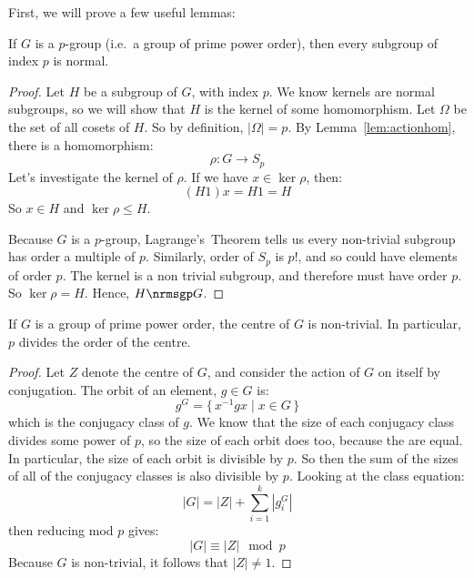 First, we will prove a few useful lemmas:

\begin{lemma}\label{lem:index_p_normal}
    \raggedright
    If \(G\) is a \(p\)-group (i.e.\ a group of prime power order), then every subgroup of index \(p\) is normal.
\end{lemma}

\begin{proof}
    Let \(H\) be a subgroup of \(G\), with index \(p\).
    We know kernels are normal subgroups, so we will show that \(H\) is the kernel of some homomorphism.
    Let \(\Omega\) be the set of all cosets of \(H\).
    So by definition, \(|\Omega| = p\).
    By Lemma~\ref{lem:actionhom}, there is a homomorphism:
    \[\rho:G \to S_p\]
    Let's investigate the kernel of \(\rho\).
    If we have \(x \in \ker{\rho}\), then:
    \[(H1)x = H1 = H\]
    So \(x \in H\) and \(\ker{\rho} \leqslant H\).

    Because \(G\) is a \(p\)-group, Lagrange's~Theorem tells us every non-trivial subgroup has order a multiple of \(p\).
    Similarly, order of \(S_{p}\) is \(p!\), and so could have elements of order \(p\).
    The kernel is a non trivial subgroup, and therefore must have order \(p\).
    So \(\ker\rho = H\).
    Hence, \(H \nrmsgp G\).
\end{proof}

\begin{lemma}\label{lem:z_non_trivial}
    \raggedright
    If \(G\) is a group of prime power order, the centre of \(G\) is non-trivial.
    In particular, \(p\) divides the order of the centre.
\end{lemma}

\begin{proof}
    Let \(Z\) denote the centre of \(G\), and consider the action of \(G\) on itself by conjugation.
    The orbit of an element, \(g \in G\) is:
    \[g^G = \{\,x^{-1}gx \mid x \in G\,\}\]
    which is the conjugacy class of \(g\).
    We know that the size of each conjugacy class divides some power of \(p\), so the size of each orbit does too,
    because the are equal.
    In particular, the size of each orbit is divisible by \(p\).
    So then the sum of the sizes of all of the conjugacy classes is also divisible by \(p\).
    Looking at the class equation:
    \[|G| = |Z| + \sum_{i=1}^k |g_i^G|\]
    then reducing mod \(p\) gives:
    \[|G| \equiv |Z| \mod{p}\]
    Because \(G\) is non-trivial, it follows that \(|Z| \neq 1\).

\end{proof}

